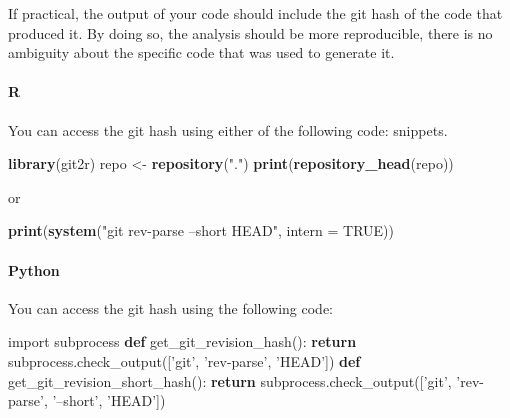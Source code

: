 \documentclass[]{book}
\newenvironment{Shaded}{\begin{snugshade}}{\end{snugshade}}
\newcommand{\ControlFlowTok}[1]{\textcolor[rgb]{0.13,0.29,0.53}{\textbf{#1}}}
\newcommand{\DataTypeTok}[1]{\textcolor[rgb]{0.13,0.29,0.53}{#1}}
\newcommand{\ImportTok}[1]{#1}
\newcommand{\KeywordTok}[1]{\textcolor[rgb]{0.13,0.29,0.53}{\textbf{#1}}}
\newcommand{\NormalTok}[1]{#1}
\newcommand{\OtherTok}[1]{\textcolor[rgb]{0.56,0.35,0.01}{#1}}
\newcommand{\StringTok}[1]{\textcolor[rgb]{0.31,0.60,0.02}{#1}}
\let\oldparagraph\paragraph
\renewcommand{\paragraph}[1]{\oldparagraph{#1}\mbox{}}
\begin{document}
If practical, the output of your code should include the git hash of the code that produced it. By doing so, the analysis should be
more reproducible, there is no ambiguity about the specific code that was used to generate it.

\hypertarget{r-1}{%
\paragraph{R}\label{r-1}}

You can access the git hash using either of the following code:
snippets.

\begin{Shaded}
\begin{Highlighting}[]
\KeywordTok{library}\NormalTok{(git2r)}
\NormalTok{repo <-}\StringTok{ }\KeywordTok{repository}\NormalTok{(}\StringTok{"."}\NormalTok{)}
\KeywordTok{print}\NormalTok{(}\KeywordTok{repository_head}\NormalTok{(repo))}
\end{Highlighting}
\end{Shaded}

or

\begin{Shaded}
\begin{Highlighting}[]
\KeywordTok{print}\NormalTok{(}\KeywordTok{system}\NormalTok{(}\StringTok{"git rev-parse --short HEAD"}\NormalTok{, }\DataTypeTok{intern =} \OtherTok{TRUE}\NormalTok{))}
\end{Highlighting}
\end{Shaded}

\hypertarget{python-1}{%
\paragraph{Python}\label{python-1}}

You can access the git hash using the following code:

\begin{Shaded}
\begin{Highlighting}[]
\ImportTok{import}\NormalTok{ subprocess}
\KeywordTok{def}\NormalTok{ get_git_revision_hash():}
    \ControlFlowTok{return}\NormalTok{ subprocess.check_output([}\StringTok{'git'}\NormalTok{, }\StringTok{'rev-parse'}\NormalTok{, }\StringTok{'HEAD'}\NormalTok{])}
\KeywordTok{def}\NormalTok{ get_git_revision_short_hash():}
    \ControlFlowTok{return}\NormalTok{ subprocess.check_output([}\StringTok{'git'}\NormalTok{, }\StringTok{'rev-parse'}\NormalTok{, }\StringTok{'--short'}\NormalTok{, }\StringTok{'HEAD'}\NormalTok{])}
\end{Highlighting}
\end{Shaded}
\end{document}
